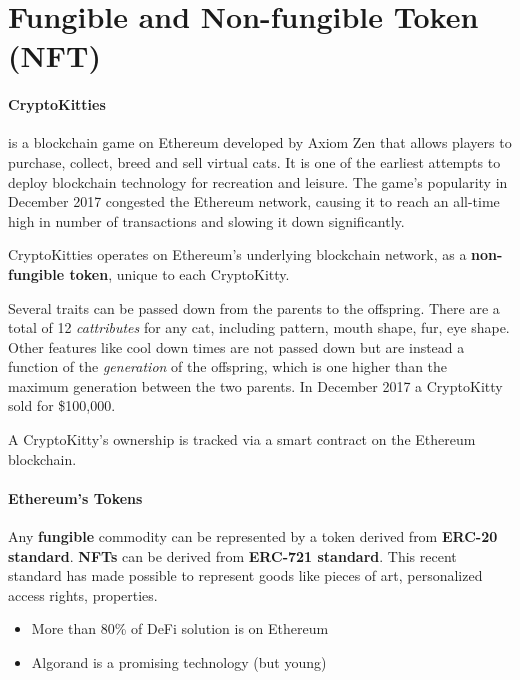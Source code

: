 \section{Fungible and Non-fungible Token (NFT)}


\paragraph{CryptoKitties} is a blockchain game on Ethereum developed by Axiom Zen that allows players to purchase, collect, breed and sell virtual cats. It is one of the earliest attempts to deploy blockchain technology for recreation and leisure. The game's popularity in December 2017 congested the Ethereum network, causing it to reach an all-time high in number of transactions and slowing it down significantly.

CryptoKitties operates on Ethereum's underlying blockchain network, as a \textbf{non-fungible token}, unique to each CryptoKitty.

Several traits can be passed down from the parents to the offspring. There are a total of 12 \emph{cattributes} for any cat, including pattern, mouth shape, fur, eye shape. Other features like cool down times are not passed down but are instead a function of the \emph{generation} of the offspring, which is one higher than the maximum generation between the two parents. In December 2017 a CryptoKitty sold for \$100,000.

A CryptoKitty's ownership is tracked via a smart contract on the Ethereum blockchain.

\paragraph{Ethereum's Tokens} Any \textbf{fungible} commodity can be represented by a token derived from \textbf{ERC-20 standard}. \textbf{NFTs} can be derived from \textbf{ERC-721 standard}. This recent standard has made possible to represent goods like pieces of art, personalized access rights, properties.

\begin{itemize}
	\item More than 80\% of DeFi solution is on Ethereum
	\item Algorand is a promising technology (but young)
\end{itemize}


